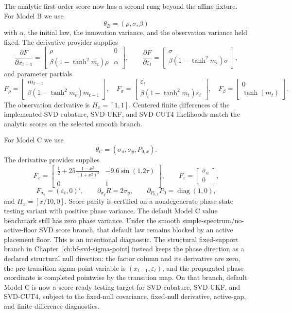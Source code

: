 The analytic first-order score now has a second rung beyond the affine fixture.
For Model B we use
\[
  \theta_B=(\rho,\sigma,\beta)
\]
with \(\alpha\), the initial law, the innovation variance, and the observation
variance held fixed.  The derivative provider supplies
\[
  \frac{\partial F}{\partial x_{t-1}}
  =
  \begin{bmatrix}
    \rho & 0\\
    \beta(1-\tanh^2 m_t)\rho & \alpha
  \end{bmatrix},
  \qquad
  \frac{\partial F}{\partial \varepsilon_t}
  =
  \begin{bmatrix}
    \sigma\\
    \beta(1-\tanh^2 m_t)\sigma
  \end{bmatrix},
\]
and parameter partials
\[
  F_\rho=
  \begin{bmatrix}
    m_{t-1}\\
    \beta(1-\tanh^2 m_t)m_{t-1}
  \end{bmatrix},\quad
  F_\sigma=
  \begin{bmatrix}
    \varepsilon_t\\
    \beta(1-\tanh^2 m_t)\varepsilon_t
  \end{bmatrix},\quad
  F_\beta=
  \begin{bmatrix}
    0\\
    \tanh(m_t)
  \end{bmatrix}.
\]
The observation derivative is \(H_x=[1,1]\).  Centered finite differences of
the implemented SVD cubature, SVD-UKF, and SVD-CUT4 likelihoods match the
analytic scores on the selected smooth branch.

For Model C we use
\[
  \theta_C=(\sigma_u,\sigma_y,P_{0,x}).
\]
The derivative provider supplies
\[
  F_x =
  \begin{bmatrix}
  \frac12+25\frac{1-x^2}{(1+x^2)^2} & -9.6\sin(1.2\tau)\\
  0 & 1
  \end{bmatrix},
  \qquad
  F_\varepsilon =
  \begin{bmatrix}
    \sigma_u\\0
  \end{bmatrix},
\]
\[
  F_{\sigma_u}=(\varepsilon_t,0)',\qquad
  \partial_{\sigma_y}R=2\sigma_y,\qquad
  \partial_{P_{0,x}}P_0=\operatorname{diag}(1,0),
\]
and \(H_x=[x/10,0]\).  Score parity is certified on a nondegenerate
phase-state testing variant with positive phase variance.  The default Model C
value benchmark still has zero phase variance.  Under the smooth
simple-spectrum/no-active-floor SVD score branch, that default law remains
blocked by an active placement floor.  This is an intentional diagnostic.  The
structural fixed-support branch in Chapter~\ref{ch:bf-svd-sigma-point} instead
keeps the phase direction as a declared structural null direction: the factor
column and its derivative are zero, the pre-transition sigma-point variable is
\((x_{t-1},\varepsilon_t)\), and the propagated phase coordinate is completed
pointwise by the transition map.  On that branch, default Model C is now a
score-ready testing target for SVD cubature, SVD-UKF, and SVD-CUT4, subject to
the fixed-null covariance, fixed-null derivative, active-gap, and
finite-difference diagnostics.

